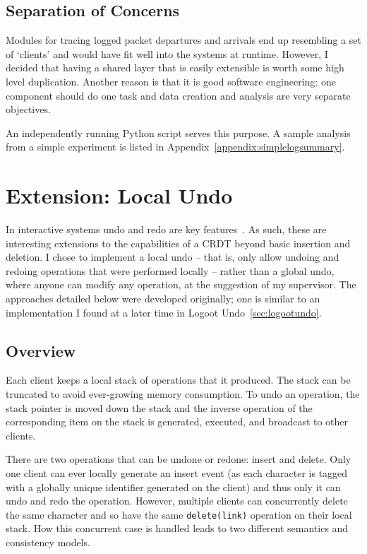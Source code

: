\documentclass[12pt,a4paper,twoside,openright]{report}
\begin{document}
	
	\subsection{Separation of Concerns}
	
	Modules for tracing logged packet departures and arrivals end up resembling a set of `clients' and would have fit well into the systems at runtime. However, I decided that having a shared layer that is easily extensible is worth some high level duplication. Another reason is that it is good software engineering: one component should do one task and data creation and analysis are very separate objectives.
	
	An independently running Python script serves this purpose. A sample analysis from a simple experiment is listed in Appendix~\ref{appendix:simplelogsummary}.	
	
	
	
\section{Extension: Local Undo} \label{sec:undo}
	
	In interactive systems undo and redo are key features~\cite{shneiderman1982}. As such, these are interesting extensions to the capabilities of a CRDT beyond basic insertion and deletion. I chose to implement a local undo -- that is, only allow undoing and redoing operations that were performed locally -- rather than a global undo, where anyone can modify any operation, at the suggestion of my supervisor. The approaches detailed below were developed originally; one is similar to an implementation I found at a later time in Logoot Undo~\cref{sec:logootundo}.
	
	\subsection{Overview}
	Each client keeps a local stack of operations that it produced. The stack can be truncated to avoid ever-growing memory consumption. To undo an operation, the stack pointer is moved down the stack and the inverse operation of the corresponding item on the stack is generated, executed, and broadcast to other clients.
	
	There are two operations that can be undone or redone: insert and delete. Only one client can ever locally generate an insert event (as each character is tagged with a globally unique identifier generated on the client) and thus only it can undo and redo the operation. However, multiple clients can concurrently delete the same character and so have the same \texttt{delete(link)} operation on their local stack. How this concurrent case is handled leads to two different semantics and consistency models.
	
\end{document}
